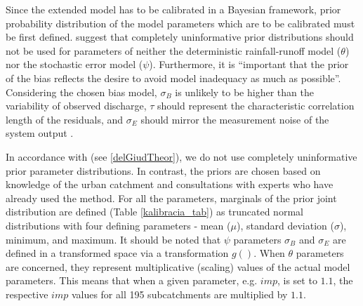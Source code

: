 \documentclass{ctuthesis}\usepackage[]{graphicx}\usepackage[]{color}
\begin{document}
Since the extended model has to be calibrated in a Bayesian framework, prior probability distribution of the model parameters which are to be calibrated must be first defined. \cite{giudice2013improving} suggest that completely uninformative prior distributions should not be used for parameters of neither the deterministic rainfall-runoff model ($\theta$) nor  the stochastic error model ($\psi$). Furthermore, it is \enquote{important that the prior of the bias reflects the desire to avoid model inadequacy as much as possible}. Considering the chosen bias model, $\sigma_{B}$ is unlikely to be higher than the variability of observed discharge, $\tau$ should represent the characteristic correlation length of the residuals, and  $\sigma_E$ should mirror the measurement noise of the system output \cite{giudice2013improving}.

In accordance with \cite{giudice2013improving} (see \ref{delGiudTheor}), we do not use completely uninformative prior parameter distributions. In contrast, the priors are chosen based on knowledge of the urban catchment and consultations with experts who have already used the method. For all the parameters, marginals of the prior joint distribution are defined (Table \ref{kalibracia_tab}) as truncated normal distributions with four defining parameters - mean ($\mu$), standard deviation ($\sigma$), minimum, and maximum. It should be noted that $\psi$ parameters $\sigma_B$ and  $\sigma_E$ are defined in a transformed space via a transformation $g()$.  When $\theta$ parameters are concerned, they represent multiplicative (scaling) values of the actual model parameters. This means that when a given parameter, e.g. $imp$, is set to $1.1$, the respective $imp$ values for all 195 subcatchments are multiplied by $1.1$.
\end{document}
